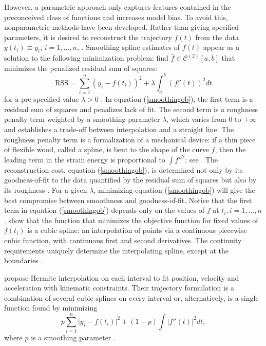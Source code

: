 However, a parametric approach only captures features contained in the preconceived class of functions \citep{yao2005functional} and increases model bias. To avoid this, nonparametric methods have been developed. Rather than giving specified parameters, it is desired to reconstruct the trajectory $f(t)$ from the data $y(t_i)\equiv y_i$, $i=1, \ldots, n$, \citep{craven1978smoothing}. Smoothing spline estimates of $f(t)$ appear as a solution to the following minimization problem: find $\hat{f} \in \mathcal{C}^{(2)}[a,b]$ that minimizes the penalized residual sum of squares:
\begin{equation}\label{smoothingob}
\mbox{RSS}=\sum_{i=1}^{n}\left(  y_i-f(t_i)\right)^2+\lambda\int_{a}^{b} \left(f''(t)\right)^2dt
\end{equation}
for a pre-specified value $\lambda>0$ \citep{aydin2012smoothing}. In equation (\ref{smoothingob}), the first term is a residual sum of squares and penalizes lack of fit. The second term is a roughness penalty term weighted by a smoothing parameter $\lambda$, which varies from 0 to $+\infty$ and establishes a trade-off between interpolation and a straight line. The roughness penalty term is a formalization of a mechanical device: if a thin piece of flexible wood, called a spline, is bent to the shape of the curve $f$, then the leading term in the strain energy is proportional to $\int f''^2$; see \eg \citep{green1993nonparametric}. The reconstruction cost, equation (\ref{smoothingob}), is determined not only by its goodness-of-fit to the data quantified by the residual sum of squares but also by its roughness \citep{schwarz2012geodesy}. For a given $\lambda$, minimizing equation (\ref{smoothingob}) will give the best compromise between smoothness and goodness-of-fit. Notice that the first term in equation (\ref{smoothingob}) depends only on the values of $f$ at $t_i, i=1, \ldots, n$. \cite{green1993nonparametric} show that the function that minimizes the objective function for fixed values of $f(t_i)$ is a cubic spline: an interpolation of points via a continuous piecewise cubic function, with continuous first and second derivatives. The continuity requirements uniquely determine the interpolating spline, except at the boundaries \citep{sealfon2005smoothing}.


\cite{zhang2013cubic} propose Hermite interpolation on each interval to fit position, velocity and acceleration with kinematic constraints. Their trajectory formulation is a combination of several cubic splines on every interval or, alternatively, is a single function found by minimizing 
\begin{equation}
p\sum_{i=1}^{n}\lvert y_i-f(t_i) \rvert^2+(1-p)\int \lvert f''(t) \rvert^2dt,
\end{equation}
where $p$ is a smoothing parameter \citep{castro2006geometric}. 



